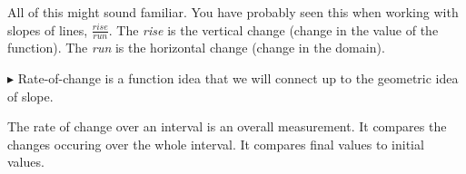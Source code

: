 \documentclass{ximera}
\begin{document}
All of this might sound familiar. You have probably seen this when working with slopes of lines, $\frac{rise}{run}$.  The \textit{rise} is the vertical change (change in the value of the function). The \textit{run} is the horizontal change (change in the domain).

$\blacktriangleright$ Rate-of-change is a function idea that we will connect up to the geometric idea of slope.





The rate of change over an interval is an overall measurement.  It compares the changes occuring over the whole interval. It compares final values to initial values. 
\end{document}
